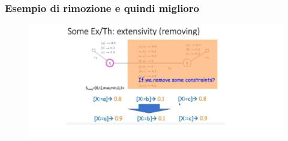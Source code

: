 \subsubsection{Esempio di rimozione e quindi miglioro}
\begin{figure}[htp]
	\centering
    \includegraphics[width=13cm, keepaspectratio]{img/Cap4/better.png}
\end{figure}


